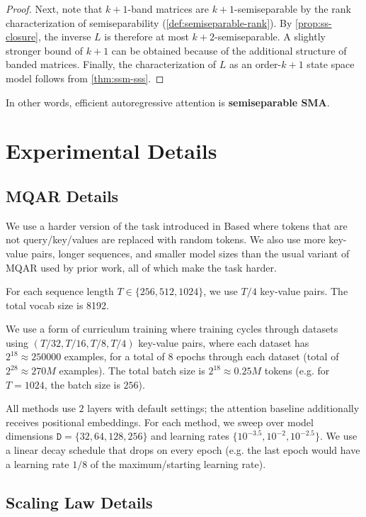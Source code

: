 \documentclass{article}
\newcommand{\citep}{\parencite}
\begin{document}
\begin{proof}
  Next, note that $k+1$-band matrices are $k+1$-semiseparable by the rank characterization of semiseparability (\cref{def:semiseparable-rank}).
  By \cref{prop:ss-closure}, the inverse $L$ is therefore at most $k+2$-semiseparable.
  A slightly stronger bound of $k+1$ can be obtained because of the additional structure of banded matrices.
  Finally, the characterization of $L$ as an order-$k+1$ state space model follows from \cref{thm:ssm-sss}.
\end{proof}

In other words, efficient autoregressive attention is \textbf{semiseparable SMA}.

\section{Experimental Details}
\label{sec:exp-details}

\subsection{MQAR Details}
\label{sec:exp-details:mqar}

We use a harder version of the task introduced in Based \citep{arora2024simple} where tokens that are not query/key/values are replaced with random tokens.
We also use more key-value pairs, longer sequences, and smaller model sizes than the usual variant of MQAR used by prior work, all of which make the task harder.

For each sequence length $T \in \{256, 512, 1024\}$, we use $T/4$ key-value pairs. 
The total vocab size is 8192.

We use a form of curriculum training where training cycles through datasets using $(T/32, T/16, T/8, T/4)$ key-value pairs, where each dataset has $2^{18} \approx 250000$ examples, for a total of $8$ epochs through each dataset (total of $2^{28} \approx 270M$ examples).
The total batch size is $2^{18} \approx 0.25M$ tokens (e.g. for $T=1024$, the batch size is $256$).

All methods use $2$ layers with default settings; the attention baseline additionally receives positional embeddings.
For each method, we sweep over model dimensions $\mathtt{D} = \{32, 64, 128, 256\}$ and learning rates $\{10^{-3.5}, 10^{-2}, 10^{-2.5}\}$.
We use a linear decay schedule that drops on every epoch (e.g. the last epoch would have a learning rate $1/8$ of the maximum/starting learning rate).

\subsection{Scaling Law Details}
\label{sec:exp-details:lm:scaling}
\end{document}
